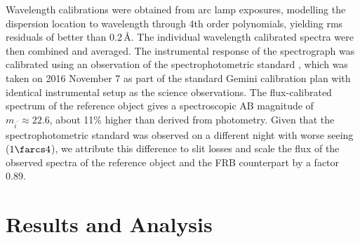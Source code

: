 \documentclass[twocolumn]{aastex61}
\begin{document}
Wavelength calibrations were obtained from arc lamp exposures,
modelling the dispersion location to wavelength through 4th order
polynomials, yielding rms residuals of better than 0.2\,\AA. The
individual wavelength calibrated spectra were then combined and
averaged. The instrumental response of the spectrograph was calibrated
using an observation of the spectrophotometric standard
 \citep{hws+92,hsh+94}, which was taken on 2016
November 7 as part of the standard Gemini calibration plan with
identical instrumental setup as the science observations. The flux-calibrated spectrum of the reference object gives a spectroscopic AB magnitude of $m_{i^\prime}\approx22.6$, about 11\% higher than derived from photometry. Given that the spectrophotometric standard
was observed on a different night with worse seeing ($1\farcs4$), we
attribute this difference to slit losses and scale the flux of the observed
spectra of the reference object and the FRB counterpart by a factor
0.89.



\section{Results and Analysis}
\label{sec:results}

\end{document}

